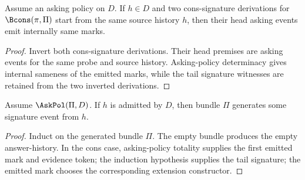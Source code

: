 \begin{theorem}
\label{thm:signature-cons-head-mark-determinacy}
Assume an asking policy on \(D\). If \(h\in D\) and two cons-signature derivations for \(\Bcons(\pi,\Pi)\) start from the same source history \(h\), then their head asking events emit internally same marks.
\end{theorem}
\begin{proof}
Invert both cons-signature derivations. Their head premises are asking events for the same probe and source history. Asking-policy determinacy gives internal sameness of the emitted marks, while the tail signature witnesses are retained from the two inverted derivations.
\end{proof}

\begin{theorem}
\label{thm:signature-totality-under-policy}
Assume \(\AskPol(\Pi,D)\). If \(h\) is admitted by \(D\), then bundle \(\Pi\) generates some signature event from \(h\).
\end{theorem}
\begin{proof}
Induct on the generated bundle \(\Pi\). The empty bundle produces the empty answer-history. In the cons case, asking-policy totality supplies the first emitted mark and evidence token; the induction hypothesis supplies the tail signature; the emitted mark chooses the corresponding extension constructor.
\end{proof}

